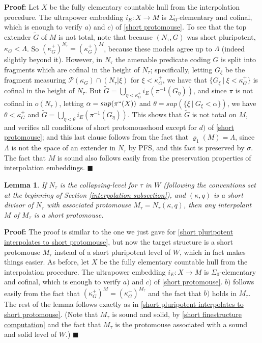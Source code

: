 \documentclass[12pt]{article}
\newtheorem{lem}[thm]{Lemma}
\begin{document}
\textbf{Proof:} Let $X$ be the fully elementary countable hull from the interpolation procedure.  The ultrapower embedding $i_E: X \longrightarrow M$ is $\Sigma_0$-elementary and cofinal, which is enough to verify $a)$ and $c)$ of \ref{short protomouse}.  To see that the top extender $\tilde{G}$ of $M$ is not total, note that because $(N_\tau , G)$ was short pluripotent, $\kappa_G < \Lambda$.  So $(\kappa_G^+ )^{N_\tau} = (\kappa_G^+)^M$, because these models agree up to $\Lambda$ (indeed slightly beyond it).  However, in $N_\tau$ the amenable predicate coding $G$ is split into fragments which are cofinal in the height of $N_\tau$; specifically, letting $G_\xi$ be the fragment measuring $\mathcal{P} (\kappa_G) \cap (N_\tau | \xi)$ for $\xi < \kappa_G^+$, we have that $\{ G_\xi \ | \ \xi < \kappa_G^+ \}$ is cofinal in the height of $N_\tau$.  But $\tilde{G} = \bigcup_{\eta < \kappa_G^+} i_E ( \pi^{-1} (G_\eta ))$, and since $\pi$ is not cofinal in $o(N_\tau )$, letting $\alpha = sup(\pi `` (X))$ and $\theta = sup ( \{ \xi \ | \ G_\xi < \alpha \} )$, we have $\theta < \kappa_G^+$ and $\tilde{G} = \bigcup_{\eta < \theta} i_E ( \pi^{-1} (G_\eta ))$.  This shows that $\tilde{G}$ is not total on $M$, and verifies all conditions of short protomousehood except for $d)$ of \ref{short protomouse}; and this last clause follows from the fact that $\varrho_{1} (M) = \Lambda$, since $\Lambda$ is not the space of an extender in $N_\tau$ by PFS, and this fact is preserved by $\sigma$.  The fact that $M$ is sound also follows easily from the preservation properties of interpolation embeddings. $\blacksquare$\\

\begin{lem} \label{associated short protomouse interpolates to short protomouse}
If $N_\tau$ is the collapsing-level for $\tau$ in $W$ (following the conventions set at the beginning of Section \ref{interpolation subsection}), and $(\kappa , q)$ is a short divisor of $N_\tau$ with associated protomouse $M_\tau = N_\tau (\kappa , q )$, then any interpolant $M$ of $M_\tau$ is a short protomouse.
\end{lem}

\textbf{Proof:} The proof is similar to the one we just gave for \ref{short pluripotent interpolates to short protomouse}, but now the target structure is a short protomouse $M_\tau$ instead of a short pluripotent level of $W$, which in fact makes things easier.  As before, let $X$ be the fully elementary countable hull from the interpolation procedure.  The ultrapower embedding $i_E: X \longrightarrow M$ is $\Sigma_0$-elementary and cofinal, which is enough to verify $a)$ and $c)$ of \ref{short protomouse}.  $b)$ follows easily from the fact that $(\kappa_G^+)^M = (\kappa_G^+)^{M_\tau}$ and the fact that $b)$ holds in $M_\tau$.  The rest of the lemma follows exactly as in \ref{short pluripotent interpolates to short protomouse}.  (Note that $M_\tau$ is sound and solid, by \ref{short finestructure computation} and the fact that $M_\tau$ is the protomouse associated with a sound and solid level of $W$.) $\blacksquare$\\
\end{document}
